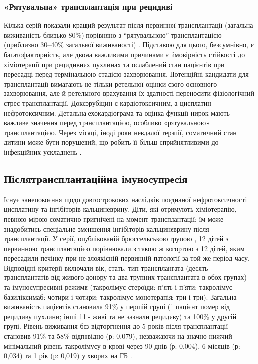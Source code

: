 \subsubsection{«Рятувальна» трансплантація при рецидиві}

Кілька серій показали кращий результат після первинної трансплантації (загальна виживаність близько 80\%) порівняно з “рятувальною” трансплантацією (приблизно 30–40\% загальної виживаності) \cite{pmid15285242}. Підставою для цього, безсумнівно, є багатофакторність, але двома важливими причинами є ймовірність стійкості до хіміотерапії при рецидивних пухлинах та ослаблений стан пацієнтів при пересадці перед термінальною стадією захворювання. Потенційні кандидати для трансплантації вимагають не тільки ретельної оцінки свого основного захворювання, але й ретельного врахування їх здатності переносити фізіологічний стрес трансплантації. Доксорубіцин є кардіотоксичним, а цисплатин - нефротоксичним. Детальна ехокардіограма та оцінка функції нирок мають важливе значення перед трансплантацією, особливо «рятувальною» трансплантацією. Через місяці, іноді роки невдалої терапії, соматичний стан дитини може бути порушений, що робить її більш сприйнятливими до інфекційних ускладнень \cite{pmid15285242}.

\subsection{Післятрансплантаційна імуносупресія}

Існує занепокоєння щодо довгострокових наслідків поєднаної нефротоксичності цисплатину та інгібіторів кальциневрину. Діти, які отримують хіміотерапію, певною мірою соматично пригнічені на момент трансплантації; їм може знадобитись спеціальне зменшення інгібіторів кальциневрину після трансплантації. У серії, опублікованій брюссельською групою \cite{pmid18444949}, 12 дітей з первинною трансплантацією порівнювали з такою ж когортою з 12 дітей, яким пересадили печінку при не злоякісній первинній патології за той же період часу. Відповідні критерії включали вік, стать, тип трансплантата (десять трансплантатів від живого донору та два трупних трансплантата в обох групах) та імуносупресивні режими (такролімус-стероїди: п’ять і п’яти; такролімус-базиліксимаб: чотири і чотири; такролімус монотерапія: три і три). Загальна виживаність пацієнтів становила 91\% у першій групі (1 пацієнт помер від рецидиву пухлини; інші 11 - живі та не зазнали рецидиву) та 100\% у другій групі. Рівень виживання без відторгнення до 5 років після трансплантації становив 91\% та 58\% відповідно (р: 0,079), незважаючи на значно нижчий мінімальний рівень такролімусу в крові через 90 днів (р: 0,004), 6 місяців (р: 0,034) та 1 рік (р: 0,019) у хворих на ГБ \cite{pmid16185597}. 

